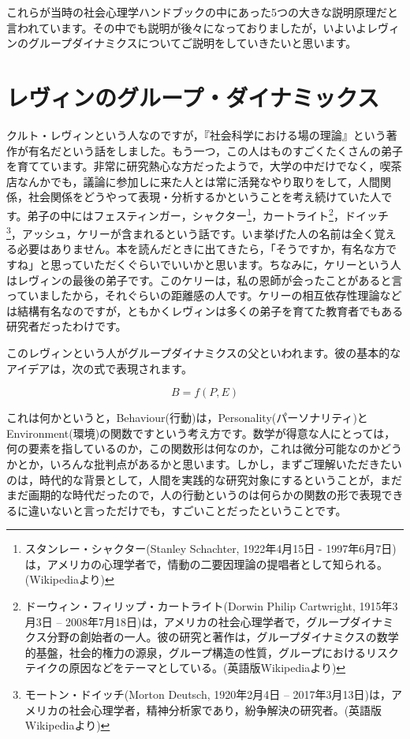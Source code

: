\documentclass{ltjsbook}
\begin{document}
これらが当時の社会心理学ハンドブックの中にあった5つの大きな説明原理だと言われています。その中でも説明が後々になっておりましたが，いよいよレヴィンのグループダイナミクスについてご説明をしていきたいと思います。

\section{レヴィンのグループ・ダイナミックス}

クルト・レヴィンという人なのですが，『社会科学における場の理論』という著作\parencite{Lewin}が有名だという話をしました。もう一つ，この人はものすごくたくさんの弟子を育てています。非常に研究熱心な方だったようで，大学の中だけでなく，喫茶店なんかでも，議論に参加しに来た人とは常に活発なやり取りをして，人間関係，社会関係をどうやって表現・分析するかということを考え続けていた人です。弟子の中にはフェスティンガー，シャクター\footnote{スタンレー・シャクター(Stanley Schachter, 1922年4月15日 - 1997年6月7日)は，アメリカの心理学者で，情動の二要因理論の提唱者として知られる。(Wikipediaより)}，カートライト\footnote{ドーウィン・フィリップ・カートライト(Dorwin Philip Cartwright, 1915年3月3日 – 2008年7月18日)は，アメリカの社会心理学者で，グループダイナミクス分野の創始者の一人。彼の研究と著作は，グループダイナミクスの数学的基盤，社会的権力の源泉，グループ構造の性質，グループにおけるリスクテイクの原因などをテーマとしている。(英語版Wikipediaより)}，ドイッチ\footnote{モートン・ドイッチ(Morton Deutsch, 1920年2月4日 – 2017年3月13日)は，アメリカの社会心理学者，精神分析家であり，紛争解決の研究者。(英語版Wikipediaより)}，アッシュ，ケリーが含まれるという話です。いま挙げた人の名前は全く覚える必要はありません。本を読んだときに出てきたら，「そうですか，有名な方ですね」と思っていただくぐらいでいいかと思います。ちなみに，ケリーという人はレヴィンの最後の弟子です。このケリーは，私の恩師が会ったことがあると言っていましたから，それぐらいの距離感の人です。ケリーの相互依存性理論などは結構有名なのですが，ともかくレヴィンは多くの弟子を育てた教育者でもある研究者だったわけです。

このレヴィンという人がグループダイナミクスの父といわれます。彼の基本的なアイデアは，次の式で表現されます。

$$B = f(P,E)$$

これは何かというと，Behaviour(行動)は，Personality(パーソナリティ)とEnvironment(環境)の関数ですという考え方です。数学が得意な人にとっては，何の要素を指しているのか，この関数形は何なのか，これは微分可能なのかどうかとか，いろんな批判点があるかと思います。しかし，まずご理解いただきたいのは，時代的な背景として，人間を実践的な研究対象にするということが，まだまだ画期的な時代だったので，人の行動というのは何らかの関数の形で表現できるに違いないと言っただけでも，すごいことだったということです。
\end{document}
